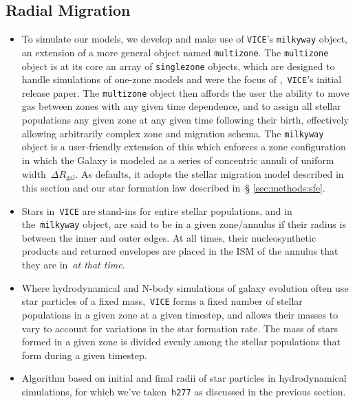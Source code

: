 \documentclass[fleqn, usenatbib]{mnras}
\begin{document}
\subsection{Radial Migration} 
\label{sec:methods:migration} 
\begin{itemize} 
	\item To simulate our models, we develop and make use of \texttt{VICE}'s 
	\texttt{milkyway} object, an extension of a more general object named 
	\texttt{multizone}. The \texttt{multizone} object is at its core an array 
	of \texttt{singlezone} objects, which are designed to handle 
	simulations of one-zone models and were the focus of 
	\citet{Johnson2020},~\texttt{VICE}'s initial release paper. The 
	\texttt{multizone} object then affords the user the ability to move 
	gas between zones with any given time dependence, and to assign all 
	stellar populations any given zone at any given time following their 
	birth, effectively allowing arbitrarily complex zone and migration 
	schema. The \texttt{milkyway} object is a user-friendly extension of this 
	which enforces a zone configuration in which the Galaxy is modeled as a 
	series of concentric annuli of uniform width~$\Delta R_\text{gal}$. As 
	defaults, it adopts the stellar migration model described in this section 
	{\color{red}and our star formation law described in~\S 
	\ref{sec:methods:sfe}.} 

	\item Stars in~\texttt{VICE} are stand-ins for entire stellar 
	populations, and in the~\texttt{milkyway} object, are said to be in a 
	given zone/annulus if their radius is between the inner and outer 
	edges. At all times, their nucleosynthetic products and returned envelopes 
	are placed in the ISM of the annulus that they are in~\textit{at that 
	time}. 

	\item Where hydrodynamical and N-body simulations of galaxy evolution 
	often use star particles of a fixed mass,~\texttt{VICE} forms a fixed 
	number of stellar populations in a given zone at a given timestep, 
	and allows their masses to vary to account for variations in the star 
	formation rate. The mass of stars formed in a given zone is divided 
	evenly among the stellar populations that form during a given 
	timestep. 

	\item Algorithm based on initial and final radii of star particles in 
	hydrodynamical simulations, for which we've taken~\texttt{h277} as 
	discussed in the previous section. 


\end{itemize}
\end{document}
